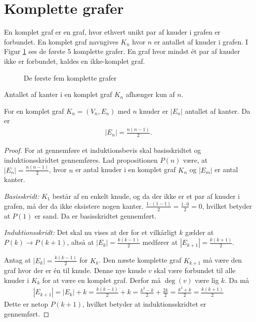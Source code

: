 \section{Komplette grafer}
En komplet graf er en graf, hvor ethvert unikt par af knuder i grafen er forbundet.
En komplet graf navngives $K_n$ hvor $n$ er antallet af knuder i grafen.
I Figur \ref{fig:komplette_grafer} ses de første 5 komplette grafer.
En graf hvor mindst ét par af knuder ikke er forbundet, kaldes en ikke-komplet graf.

\begin{figure}[h]
	\centering
	
	\caption{De første fem komplette grafer} \label{fig:komplette_grafer}
\end{figure}

Antallet af kanter i en komplet graf $K_n$ afhænger kun af $n$.

\begin{thm}
	For en komplet graf $K_n = (V_n, E_n)$ med $n$ knuder er $|E_n|$ antallet af kanter. Da er
	\begin{align*}
		|E_n| = \frac{n (n - 1)}{2}.
	\end{align*}
\end{thm}
\begin{proof}
	For at gennemføre et induktionsbevis skal basisskridtet og induktionsskridtet gennemføres.
	Lad propositionen $P(n)$ være, at $|E_n|= \frac{n (n - 1)}{2}$, hvor $n$ er antal knuder i en komplet graf $K_n$ og $|E_m|$ er antal kanter. 

	\textit{Basisskridt:} $K_1$ består af en enkelt knude, og da der ikke er et par af knuder i grafen, må der da ikke eksistere nogen kanter.
	$\frac{1 \cdot (1-1)}{2}=\frac{ 1 \cdot 0}{2} = 0$, hvilket betyder at $P(1)$ er sand. Da er basisskridtet gennemført.

	\textit{Induktionsskridt:} Det skal nu vises at der for et vilkårligt $k$ gælder at $P(k) \to P(k + 1)$, altså at $|E_k| = \frac{k (k - 1)}{2}$ medfører at $|E_{k+1}| = \frac{k (k + 1)}{2}$.

	Antag at $|E_k| = \frac{k (k - 1)}{2}$ for $K_k$.
	Den næste komplette graf $K_{k+1}$ må være den graf hvor der er én til knude. Denne nye knude $v$ skal være forbundet til alle knuder i $K_k$ for at være en komplet graf. Derfor må $\deg (v)$ være lig $k$. Da må
	\begin{align*}
		|E_{k+1}| 
		= |E_k| + k
		= \frac{k (k - 1)}{2} + k
		= \frac{k^2 - k}{2} + \frac{2k}{2}
		= \frac{k^2 + k}{2} 
		= \frac{k (k + 1)}{2}
	\end{align*}
	Dette er netop $P(k + 1)$, hvilket betyder at induktionsskridtet er gennemført.
\end{proof}
